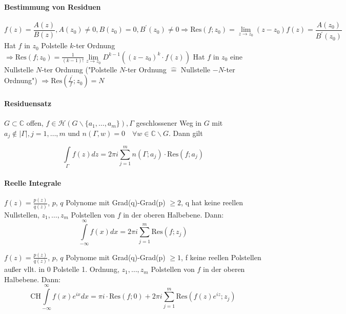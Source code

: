 \documentclass[a4paper, 10pt, DIV20, headings=small]{scrartcl}
\theoremstyle{definition}
\theoremstyle{plain}
\begin{document}
\paragraph{Bestimmung von Residuen}
$$f(z) = \frac{A(z)}{B(z)}, A(z_0) \neq 0, B(z_0) = 0, B^\prime(z_0) \neq 0 \Rightarrow \text{Res}(f;z_0) = \lim\limits_{z \to z_0} (z-z_0) f(z) = \frac{A(z_0)}{B^\prime(z_0)}$$
Hat $f$ in $z_0$ Polstelle $k$-ter Ordnung $\Rightarrow \text{Res}(f;z_0) = \frac{1}{(k-1)!} \lim\limits_{z \to z_0} D^{k-1} \left((z-z_0)^k \cdot f(z)\right)$
Hat $f$ in $z_0$ eine Nullstelle $N$-ter Ordnung ("Polstelle $N$-ter Ordnung $\hat{=}$ Nullstelle $-N$-ter Ordnung") $\Rightarrow \text{Res}\left(\frac{f^\prime}{f};z_0\right) = N$

\paragraph{Residuensatz}
$G \subset \mathbb{C}$ offen, $f \in \mathcal{H}(G \backslash \{a_1, \ldots, a_m\}), \Gamma$ geschlossener Weg in $G$ mit $a_j \notin |\Gamma|, j=1, \ldots, m$ und $n(\Gamma, w) = 0 \quad \forall w \in \mathbb{C} \backslash G$. Dann gilt

$$\int\limits_{\Gamma}{f(z) dz} = 2 \pi i \sum\limits_{j=1}^m{n(\Gamma; a_j) \cdot \text{Res}(f;a_j)}$$

\paragraph{Reelle Integrale}
$f(z) = \frac{p(z)}{q(z)}$, $p$, $q$ Polynome mit Grad(q)-Grad(p) $\geq 2$, q hat keine reellen Nullstellen,
$z_1, \ldots, z_m$ Polstellen von $f$ in der oberen Halbebene. Dann:
$$\int\limits_{-\infty}^{\infty}{f(x)dx} = 2 \pi i \sum\limits_{j=1}^m{\text{Res}(f;z_j)}$$

$f(z) = \frac{p(z)}{q(z)}$, $p$, $q$ Polynome mit Grad(q)-Grad(p) $\geq 1$, f keine reellen Polstellen außer vllt. in 0 Polstelle 1. Ordnung, $z_1, \ldots, z_m$ Polstellen von $f$ in der oberen Halbebene. Dann:
$$\text{CH} \int\limits_{-\infty}^{\infty}{f(x) e^{ix} dx} = \pi i \cdot \text{Res}(f;0) + 2 \pi i \sum\limits_{j=1}^m{\text{Res}(f(z) e^{iz};z_j)}$$
\end{document}
